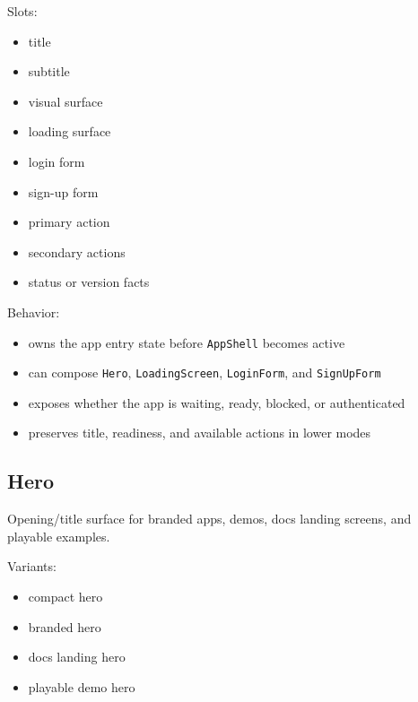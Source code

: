 Slots:

\begin{itemize}
\tightlist
\item
  title
\item
  subtitle
\item
  visual surface
\item
  loading surface
\item
  login form
\item
  sign-up form
\item
  primary action
\item
  secondary actions
\item
  status or version facts
\end{itemize}

Behavior:

\begin{itemize}
\tightlist
\item
  owns the app entry state before \texttt{A\allowbreak{}p\allowbreak{}p\allowbreak{}S\allowbreak{}h\allowbreak{}e\allowbreak{}l\allowbreak{}l} becomes active
\item
  can compose \texttt{H\allowbreak{}e\allowbreak{}r\allowbreak{}o}, \texttt{L\allowbreak{}o\allowbreak{}a\allowbreak{}d\allowbreak{}i\allowbreak{}n\allowbreak{}g\allowbreak{}S\allowbreak{}c\allowbreak{}r\allowbreak{}e\allowbreak{}e\allowbreak{}n}, \texttt{L\allowbreak{}o\allowbreak{}g\allowbreak{}i\allowbreak{}n\allowbreak{}F\allowbreak{}o\allowbreak{}r\allowbreak{}m}, and \texttt{S\allowbreak{}i\allowbreak{}g\allowbreak{}n\allowbreak{}U\allowbreak{}p\allowbreak{}F\allowbreak{}o\allowbreak{}r\allowbreak{}m}
\item
  exposes whether the app is waiting, ready, blocked, or authenticated
\item
  preserves title, readiness, and available actions in lower modes
\end{itemize}

\subsection{Hero}\label{record-128-hero}

Opening/title surface for branded apps, demos, docs landing screens, and playable examples.

Variants:

\begin{itemize}
\tightlist
\item
  compact hero
\item
  branded hero
\item
  docs landing hero
\item
  playable demo hero
\end{itemize}

